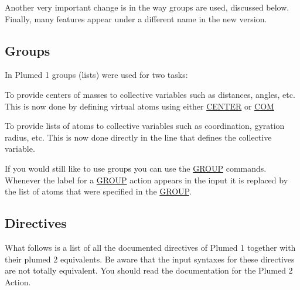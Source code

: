 Another very important change is in the way groups are used, discussed below. Finally, many features appear under a different name in the new version.\hypertarget{moving_moving-Groups}{}\subsection{Groups}\label{moving_moving-Groups}
In Plumed 1 groups (lists) were used for two tasks\+:
\begin{DoxyItemize}
\item To provide centers of masses to collective variables such as distances, angles, etc. This is now done by defining virtual atoms using either \hyperlink{CENTER}{C\+E\+N\+T\+E\+R} or \hyperlink{COM}{C\+O\+M}
\item To provide lists of atoms to collective variables such as coordination, gyration radius, etc. This is now done directly in the line that defines the collective variable.
\end{DoxyItemize}

If you would still like to use groups you can use the \hyperlink{GROUP}{G\+R\+O\+U\+P} commands. Whenever the label for a \hyperlink{GROUP}{G\+R\+O\+U\+P} action appears in the input it is replaced by the list of atoms that were specified in the \hyperlink{GROUP}{G\+R\+O\+U\+P}.\hypertarget{moving_moving-Directives}{}\subsection{Directives}\label{moving_moving-Directives}
What follows is a list of all the documented directives of Plumed 1 together with their plumed 2 equivalents. Be aware that the input syntaxes for these directives are not totally equivalent. You should read the documentation for the Plumed 2 Action.

